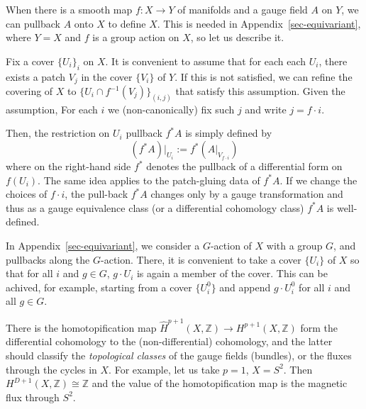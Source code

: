 \documentclass[
  letterpaper,
  DIV=11,
  numbers=noendperiod]{scrreport}
\newcounter{quartocalloutnteno}
\newcommand{\quartocalloutnte}[1]{\refstepcounter{quartocalloutnteno}\label{#1}}
\begin{document}
When there is a smooth map \(f: X \to Y\) of manifolds and a gauge field
\(A\) on \(Y\), we can pullback \(A\) onto \(X\) to define \(X\). This
is needed in Appendix~\ref{sec-equivariant}, where \(Y = X\) and \(f\)
is a group action on \(X\), so let us describe it.

Fix a cover \(\{U_i\}_i\) on \(X\). It is convenient to assume that for
each each \(U_i\), there exists a patch \(V_j\) in the cover \(\{V_i\}\)
of \(Y\). If this is not satisfied, we can refine the covering of \(X\)
to \(\{U_i\cap f^{-1}(V_j)\}_{(i,j)}\) that satisfy this assumption.
Given the assumption, For each \(i\) we (non-canonically) fix such \(j\)
and write \(j = f\cdot i\).

Then, the restriction on \(U_i\) pullback \(f^*A\) is simply defined by
\[
(f^*A)|_{U_i} := f^*(A|_{V_{f\cdot i}})
\] where on the right-hand side \(f^*\) denotes the pullback of a
differential form on \(f(U_i)\). The same idea applies to the
patch-gluing data of \(f^*A\). If we change the choices of \(f\cdot i\),
the pull-back \(f^* A\) changes only by a gauge transformation and thus
as a gauge equivalence class (or a differential cohomology class)
\(f^* A\) is well-defined.

In Appendix~\ref{sec-equivariant}, we consider a \(G\)-action of \(X\)
with a group \(G\), and pullbacks along the \(G\)-action. There, it is
convenient to take a cover \(\{U_i\}\) of \(X\) so that for all \(i\)
and \(g\in G\), \(g\cdot U_i\) is again a member of the cover. This can
be achived, for example, starting from a cover \(\{U_i^0\}\) and append
\(g\cdot U_i^0\) for all \(i\) and all \(g\in G\).

\begin{tcolorbox}[enhanced jigsaw, opacityback=0, opacitybacktitle=0.6, leftrule=.75mm, arc=.35mm, coltitle=black, breakable, colframe=quarto-callout-note-color-frame, titlerule=0mm, colback=white, bottomrule=.15mm, left=2mm, colbacktitle=quarto-callout-note-color!10!white, toptitle=1mm, bottomtitle=1mm, title=\textcolor{quarto-callout-note-color}{\faInfo}\hspace{0.5em}{Note \ref*{nte-homotopification-and-flux}: Homotopification and Flux}, rightrule=.15mm, toprule=.15mm]

\quartocalloutnte{nte-homotopification-and-flux} 

There is the homotopification map
\(\hat{H}^{p+1}(X,\mathbb{Z}) \to H^{p+1}(X,\mathbb{Z})\) form the
differential cohomology to the (non-differential) cohomology, and the
latter should classify the \emph{topological classes} of the gauge
fields (bundles), or the fluxes through the cycles in \(X\). For
example, let us take \(p=1\), \(X=S^2\). Then
\(H^{D+1}(X,\mathbb{Z})\cong \mathbb{Z}\) and the value of the
homotopification map is the magnetic flux through \(S^2\).

\end{tcolorbox}
\end{document}
